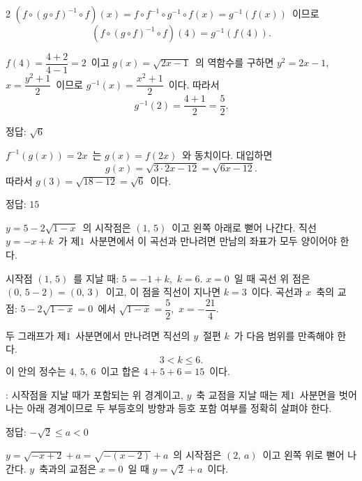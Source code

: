 \documentclass[10pt,fleqn]{article}
\begin{document}
\begin{multicols*}{2}
$(f\circ(g\circ f)^{-1}\circ f)(x)=f\circ f^{-1}\circ g^{-1}\circ f(x)=g^{-1}(f(x))$\ 이므로
\[ (f\circ(g\circ f)^{-1}\circ f)(4)=g^{-1}(f(4)). \]

$f(4)=\dfrac{4+2}{4-1}=2$\ 이고 $g(x)=\sqrt{2x-1}$\ 의 역함수를 구하면 $y^{2}=2x-1$,\ $x=\dfrac{y^{2}+1}{2}$\ 이므로 $g^{-1}(x)=\dfrac{x^{2}+1}{2}$\ 이다. 따라서
\[ g^{-1}(2)=\dfrac{4+1}{2}=\dfrac{5}{2}. \]

\begin{dmanswerbox}정답: $\sqrt{6}$\end{dmanswerbox}

$f^{-1}(g(x))=2x$\ 는 $g(x)=f(2x)$\ 와 동치이다. 대입하면
\[ g(x)=\sqrt{3\cdot 2x-12}=\sqrt{6x-12}. \]
따라서 $g(3)=\sqrt{18-12}=\sqrt{6}$\ 이다.
\begin{dmanswerbox}
정답: $15$
\end{dmanswerbox}

$y=5-2\sqrt{1-x}$\ 의 시작점은 $(1,\, 5)$\ 이고 왼쪽 아래로 뻗어 나간다. 직선 $y=-x+k$\ 가 제$1$\ 사분면에서 이 곡선과 만나려면 만남의 좌표가 모두 양이어야 한다.

시작점 $(1,\, 5)$\ 를 지날 때: $5=-1+k$,\ $k=6$.
$x=0$\ 일 때 곡선 위 점은 $(0,\, 5-2)=(0,\, 3)$\ 이고, 이 점을 직선이 지나면 $k=3$\ 이다.
곡선과 $x$\ 축의 교점: $5-2\sqrt{1-x}=0$\ 에서 $\sqrt{1-x}=\dfrac{5}{2}$,\ $x=-\dfrac{21}{4}$.

두 그래프가 제$1$\ 사분면에서 만나려면 직선의 $y$\ 절편 $k$\ 가 다음 범위를 만족해야 한다.
\[ 3<k \le 6. \]
이 안의 정수는 $4,\, 5,\, 6$\ 이고 합은 $4+5+6=15$\ 이다.

\begin{dmcriticalpoint}
: 시작점을 지날 때가 포함되는 위 경계이고, $y$\ 축 교점을 지날 때는 제$1$\ 사분면을 벗어나는 아래 경계이므로 두 부등호의 방향과 등호 포함 여부를 정확히 살펴야 한다.
\end{dmcriticalpoint}

\begin{dmanswerbox}
정답: $-\sqrt{2}\le a<0$
\end{dmanswerbox}

$y=\sqrt{-x+2}+a=\sqrt{-(x-2)}+a$\ 의 시작점은 $(2,\, a)$\ 이고 왼쪽 위로 뻗어 나간다. $y$\ 축과의 교점은 $x=0$\ 일 때 $y=\sqrt{2}+a$\ 이다.


\end{multicols*}
\end{document}
